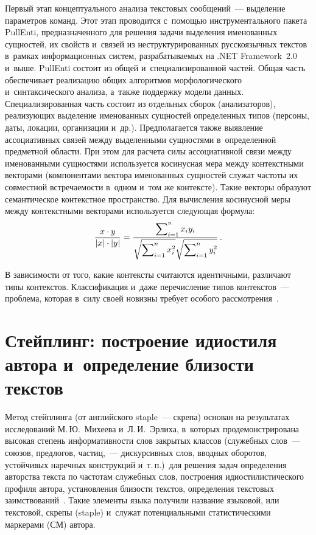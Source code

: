 \begin{multicols}{2}
     Первый этап концептуального анализа текстовых сообщений~--- 
выделение параметров команд. Этот этап проводится с~помощью 
инструментального пакета PullEnti, предназначенного для 
решения задачи выделения именованных сущностей, их свойств и~связей из 
неструктурированных русскоязычных текстов в~рамках информационных 
систем, разрабатываемых на .NET Framework~2.0 и~выше. PullEnti состоит из 
общей и~специализированной частей. Общая часть обеспечивает реализацию 
общих алгоритмов морфологического и~синтаксического анализа, а~также 
поддержку модели данных. Специализированная часть состоит из отдельных 
сборок (анализаторов), реализующих выделение именованных сущностей 
определенных типов (персоны, даты, локации, организации и~др.). 
Предполагается также выявление ассоциативных связей между выделенными 
сущностями в~определенной предметной области. При этом для расчета силы 
ассоциативной связи между именованными сущностями используется 
косинусная мера между контекстными векторами (компонентами вектора 
именованных сущностей служат частоты их совместной встречаемости 
в~одном и~том же контексте). Такие векторы образуют семантическое 
контекстное пространство. Для вычисления косинусной меры между 
контекстными векторами используется следующая формула:
     $$
     \displaystyle\frac{\displaystyle x\cdot y\mathstrut}{\displaystyle \vert x\vert \cdot \vert y\vert\mathstrut} =\displaystyle\frac{\displaystyle \sum\nolimits^n_{i=1} x_i 
y_i\mathstrut}{\displaystyle \sqrt{\sum\nolimits^n_{i=1} x_i^2}\sqrt{\sum\nolimits^n_{i=1} y_i^2}\mathstrut}\,.
     $$
    
     В зависимости от того, какие контексты считаются идентичными, 
различают типы контекстов. Классификация и~даже перечисление типов 
контекстов~--- проблема, которая в~силу своей новизны требует особого 
рассмотрения~\cite{7-koz, 16-koz}. 
     
   \section{Стейплинг: построение идиостиля автора 
и~определение близости текстов}
    
     Метод стейплинга (от английского staple~--- скрепа) основан на 
результатах исследований М.\,Ю.~Михеева и~Л.\,И.~Эрлиха, в~которых 
продемонстрирована высокая степень информативности слов закрытых 
классов (служебных слов~--- союзов, предлогов, частиц,~--- дискурсивных 
слов, вводных оборотов, устойчивых наречных конструкций и~т.\,п.)\ для 
решения задач определения авторства текста по частотам служебных слов, 
построения идиостилистического профиля автора, установления бли\-зости 
текстов, определения текстовых заимствований~\cite{11-koz}. Такие 
элементы языка получили название языковой, или текстовой, скрепы (staple) 
и~служат потенциальными статистическими маркерами (СМ)
автора. 


\end{multicols}
